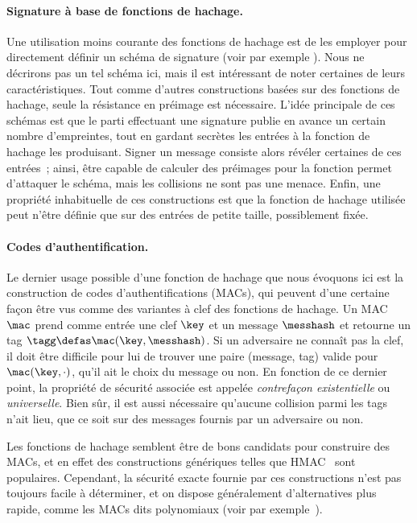 \paragraph{Signature à base de fonctions de hachage.}
Une utilisation moins courante des fonctions de hachage est de les employer pour directement définir un schéma de signature
(voir par exemple \cite{DBLP:conf/crypto/Merkle87}). Nous ne décrirons pas un tel schéma ici, mais il est intéressant de noter certaines
de leurs caractéristiques.
Tout comme d'autres constructions basées sur des fonctions de hachage, seule la résistance en préimage est nécessaire.
L'idée principale de ces schémas est que le parti effectuant une signature publie en avance un certain nombre d'empreintes, tout en gardant
secrètes les entrées à la fonction de hachage les produisant. Signer un message consiste alors révéler certaines de ces entrées~; ainsi, être capable
de calculer des préimages pour la fonction permet d'attaquer le schéma, mais les collisions ne sont pas une menace.
Enfin, une propriété inhabituelle de ces constructions est que la fonction de hachage utilisée peut n'être définie que sur des entrées de petite
taille, possiblement fixée.

\paragraph{Codes d'authentification.}
Le dernier usage possible d'une fonction de hachage que nous évoquons ici est la construction de codes d'authentifications (MACs),
qui peuvent d'une certaine façon être vus comme des variantes à clef des fonctions de hachage.
Un MAC $\mac$ prend comme entrée une clef $\key$ et un message $\messhash$ et retourne un tag
$\tagg \defas \mac(\key, \messhash)$.
Si un adversaire ne connaît pas la clef, il doit être difficile pour lui de trouver une paire (message, tag) valide pour
$\mac(\key, \cdot)$, qu'il ait le choix du message ou non.
En fonction de ce dernier point, la propriété de sécurité associée est appelée \emph{contrefaçon existentielle} ou \emph{universelle}.
Bien sûr, il est aussi nécessaire qu'aucune collision parmi les tags n'ait lieu, que ce soit sur des messages fournis par un adversaire ou non.

Les fonctions de hachage semblent être de bons candidats pour construire des MACs, et en effet des constructions génériques telles que 
HMAC~\cite{DBLP:conf/crypto/BellareCK96} sont populaires. Cependant, la sécurité exacte fournie par ces constructions n'est pas toujours facile à déterminer,
et on dispose généralement d'alternatives plus rapide, comme les MACs dits polynomiaux
(voir par exemple~\cite{DBLP:conf/crypto/BlackHKKR99}).

